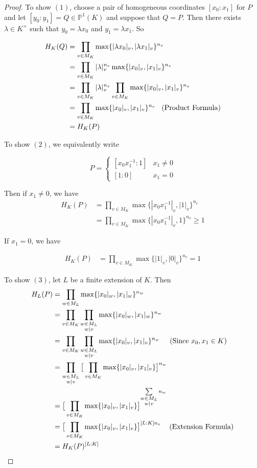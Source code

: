 \documentclass{amsart}
\renewcommand{\P}{\mathbb{P}}
\begin{document}
\begin{proof}
To show $(1)$, choose a pair of homogeneous coordinates $[x_0:x_1]$ for $P$ and let $[y_0:y_1] = Q \in \P^1(K)$ and suppose that $Q=P$. Then there exists $\lambda \in K^{\times}$ such that $y_0 = \lambda x_0$ and $y_1 = \lambda x_1$. So
 
\begin{align*}
H_K(Q) &= \prod_{v \in M_K}\max\{|\lambda x_0|_{v}, | \lambda x_1|_{v}\}^{n_{v}} \\
&= \prod_{v \in M_K}|\lambda |_{v}^{n_{v}} \max\{|x_0|_{v}, |x_1|_{v}\}^{n_{v}}\\
&= \prod_{v \in M_K}|\lambda |_{v}^{n_{v}} \prod_{v \in M_K}\max\{|x_0|_{v}, |x_1|_{v}\}^{n_{v}}\\
&= \prod_{v \in M_K}\max\{|x_0|_{v}, |x_1|_{v}\}^{n_{v}} \hspace{3mm} \text{(Product Formula)}\\
&= H_K(P)
\end{align*}

To show $(2)$, we equivalently write 

\[ P = \begin{cases} 
     [x_0x_1^{-1}:1] & x_1 \neq 0 \\
      [1:0] & x_1 = 0
   \end{cases}
\]

Then if $x_1 \neq 0$, we have 
\begin{align*}
H_K(P) 
&= \prod_{v \in M_K}\max\{|x_0x_1^{-1}|_v, |1|_v\}^{n_v}\\
&= \prod_{v \in M_K}\max\{|x_0x_1^{-1}|_v, 1\}^{n_v} \geq 1
\end{align*}  

If $x_1 = 0$, we have 

\begin{align*}
H_K(P) 
&= \prod_{v \in M_K}\max\{|1|_v, |0|_v\}^{n_v} =1
\end{align*}

To show $(3)$, let $L$ be a finite extension of $K$. 
Then 
\begin{align*}
H_L(P) 
&= \prod_{w \in M_L}\max\{|x_0|_w, |x_1|_w\}^{n_w}\\
&=\prod_{v \in M_K} \prod_{\substack{w \in M_L\\ w|v}}\max\{|x_0|_w, |x_1|_w\}^{n_w} \\
&=\prod_{v \in M_K} \prod_{\substack{w \in M_L\\ w|v}}\max\{|x_0|_v, |x_1|_v\}^{n_w} \hspace{5mm} (\text{Since } x_0, x_1 \in K)\\
&= \prod_{\substack{w \in M_L\\ w|v}}\big[ \prod_{v \in M_K}\max\{|x_0|_v, |x_1|_v\}\big]^{n_w}\\
&= \big[\prod_{v \in M_K} \max \{|x_0|_v, |x_1|_v\}\big]^{\sum\limits_{\substack{w\in M_L \\ w|v}}n_w}\\
&= \big[\prod_{v \in M_K} \max \{|x_0|_v, |x_1|_v\}\big]^{[L:K]n_v} \hspace{4mm} (\text{Extension Formula})\\ &= H_K(P)^{[L:K]}
\end{align*}
\end{proof}
\end{document}
